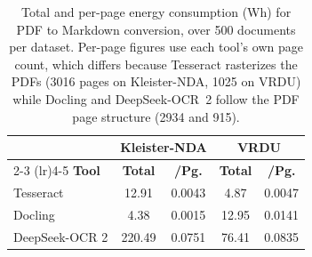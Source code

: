 \begin{table}[htb]
    \centering
    \footnotesize
    \caption{Total and per-page energy consumption (Wh) for PDF to Markdown conversion, over 500 documents per dataset. Per-page figures use each tool's own page count, which differs because Tesseract rasterizes the PDFs (3016 pages on Kleister-NDA, 1025 on VRDU) while Docling and DeepSeek-OCR~2 follow the PDF page structure (2934 and 915).}
    \label{tab:energy_consumption_integrated}
    \begin{tabular}{@{} l c c c c @{}}
        \toprule
        & \multicolumn{2}{c}{\textbf{Kleister-NDA}} & \multicolumn{2}{c}{\textbf{VRDU}} \\
        \cmidrule(lr){2-3} \cmidrule(lr){4-5}
        \textbf{Tool} & \textbf{Total} & \textbf{/Pg.} & \textbf{Total} & \textbf{/Pg.} \\
        \midrule
        Tesseract      & 12.91 & 0.0043 & 4.87 & 0.0047 \\
        Docling        & 4.38 & 0.0015 & 12.95 & 0.0141 \\
        DeepSeek-OCR 2 & 220.49 & 0.0751 & 76.41 & 0.0835 \\
        \bottomrule
    \end{tabular}
\end{table}
